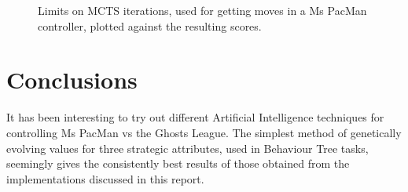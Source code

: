 \documentclass[conference]{IEEEtran}
\begin{document}
\begin{figure}
\centering
{}\qquad
{}
\caption{Limits on MCTS iterations, used for getting moves in a Ms PacMan controller, plotted against the resulting scores.}
\label{mctsIterationLimitTrials}
\end{figure}



\section{Conclusions}
It has been interesting to try out different Artificial Intelligence techniques for controlling Ms PacMan vs the Ghosts League.  The simplest method of genetically evolving values for three strategic attributes, used in Behaviour Tree tasks, seemingly gives the consistently best results of those obtained from the implementations discussed in this report.
\end{document}
